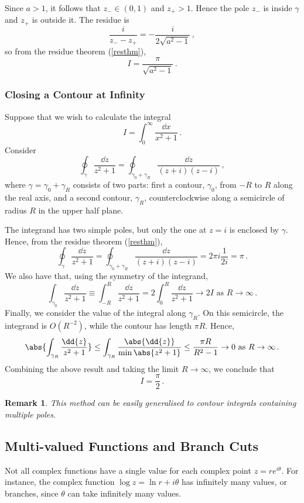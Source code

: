 \documentclass{article}
\theoremstyle{plain}\theoremheaderfont{\normalfont\itshape}\theorembodyfont{\rmfamily}\theoremseparator{.}\newtheorem*{rem}{Remark}\newtheorem*{ex}{Example}\newtheorem*{proof}{Proof}\newtheorem*{altp}{Alternative proof}
\theoremstyle{plain}\theoremheaderfont{\normalfont\bfseries}\theorembodyfont{\rmfamily}\theoremseparator{.}\newtheorem{thm}{Theorem}[section]\newtheorem{lem}[thm]{Lemma}\newtheorem{prop}[thm]{Proposition}\newtheorem*{cor}{Corollary}\newtheorem{defn}[thm]{Definition}\newtheorem{clm}[thm]{Claim}\newtheorem{clminproof}{Claim}
\theoremstyle{break}\theoremheaderfont{\normalfont\itshape}\theorembodyfont{\rmfamily}\theoremseparator{.\medskip}\newtheorem*{proofskip}{Proof}\newtheorem*{exs}{Examples}\newtheorem*{rems}{Remarks}
\theoremstyle{break}\theoremheaderfont{\normalfont\bfseries}\theorembodyfont{\rmfamily}\theoremseparator{.\medskip}\newtheorem{lemskip}[thm]{Lemma}\newtheorem{defnskip}[thm]{Definition}\newtheorem{propskip}[thm]{Proposition}\newtheorem{thmskip}[thm]{Theorem}
\numberwithin{equation}{section}
\begin{document}
	Since \(a>1\), it follows that \(z_-\in(0,1)\) and \(z_+>1\). Hence the pole \(z_-\) is inside \(\gamma\) and \(z_+\) is outside it. The residue is
	\[\frac{i}{z_--z_+}=-\frac{i}{2\sqrt{a^2-1}}\,,\]
	so from the residue theorem (\cref{resthm}),
	\[I=\frac{\pi}{\sqrt{a^2-1}}\,.\]

	\subsubsection{Closing a Contour at Infinity}
	Suppose that we wish to calculate the integral
	\[I=\int_{0}^{\infty}\frac{\dd{x}}{x^2+1}\,.\]
	Consider
	\[\oint_\gamma\frac{\dd{z}}{z^2+1}=\oint_{\gamma_0+\gamma_R}\frac{\dd{z}}{(z+i)(z-i)}\,,\]
	where \(\gamma=\gamma_0+\gamma_R\) consists of two parts: first a contour, \(\gamma_0\), from \(-R\) to \(R\) along the real axis, and a second contour, \(\gamma_R\), counterclockwise along a semicircle of radius \(R\) in the upper half plane.

	The integrand has two simple poles, but only the one at \(z=i\) is enclosed by \(\gamma\). Hence, from the residue theorem (\cref{resthm}),
	\[\oint_\gamma\frac{\dd{z}}{z^2+1}=\oint_{\gamma_0+\gamma_R}\frac{\dd{z}}{(z+i)(z-i)}=2\pi i\frac{1}{2i}=\pi\,.\]
	We also have that, using the symmetry of the integrand,
	\[\int_{\gamma_0}\frac{\dd{z}}{z^2+1}\equiv\int_{-R}^{R}\frac{\dd{z}}{z^2+1}=2\int_{0}^{R}\frac{\dd{z}}{z^2+1}\to 2I\text{ as }R\to\infty\,.\]
	Finally, we consider the value of the integral along \(\gamma_R\). On this semicircle, the integrand is \(O(R^{-2})\), while the contour has length \(\pi R\). Hence,
	\[\abs{\int_{\gamma_R}\frac{\dd{z}}{z^2+1}}\le \int_{\gamma_R}\frac{\abs{\dd{z}}}{\min\abs{z^2+1}}\le\frac{\pi R}{R^2-1}\to 0\text{ as }R\to\infty\,.\]
	Combining the above result and taking the limit \(R\to\infty\), we conclude that
	\[I=\frac{\pi}{2}\,.\]
	\begin{rem}
		This method can be easily generalised to contour integrals containing multiple poles.
	\end{rem}

	\subsection{Multi-valued Functions and Branch Cuts}
	Not all complex functions have a single value for each complex point \(z=re^{i\theta}\). For instance, the complex function \(\log z=\ln r+i\theta\) has infinitely many values, or branches, since \(\theta\) can take infinitely many values.
\end{document}

